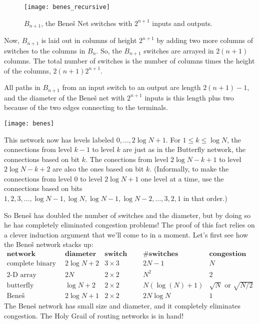 \begin{figure}
\texttt{[image: benes\_recursive]}
\caption{$B_{n+1}$, the Bene\v{s} Net switches with $2^{n+1}$ inputs
and outputs.}
\label{fig:benes-recursive}
\end{figure}

Now, $B_{n+1}$ is laid out in columns of height $2^{n+1}$ by adding two
more columns of switches to the columns in $B_n$.  So, the $B_{n+1}$
switches are arrayed in $2(n+1)$ columns.  The total number of
switches is the number of columns times the height of the columns, $2(n+1)2^{n+1}$.

All paths in $B_{n+1}$ from an input switch to an output are
length $2(n+1)-1$, and the diameter of the Bene\v{s} net with
$2^{n+1}$ inputs is this length plus two because of the two edges
connecting to the terminals.

\begin{editingnotes}

\texttt{[image: benes]}


This network now has levels labeled $0,\dots ,2 \log N + 1$. For $1 \leq k
\leq \log N$, the connections from level $k-1$ to level $k$ are just as in
the Butterfly network, the connections based on bit $k$. The conections
from level $2 \log N - k + 1$ to level $2 \log N - k + 2$ are also the
ones based on bit $k$.  (Informally, to make the connections from level
$0$ to level $2 \log N +1$ one level at a time, use the connections based
on bits $1,2,3,\dots, \log N - 1, \log N, \log N - 1, \log N - 2, \dots,
3,2,1$ in that order.)

\end{editingnotes}

So Bene\v{s} has doubled the number of switches and the diameter, but
by doing so he has completely eliminated congestion problems!  The proof
of this fact relies on a clever induction argument that we'll come to
in a moment.  Let's first see how the Bene\v{s} network stacks up:
%
\[
\begin{array}{r|c|c|c|c}
\textbf{network} &
\textbf{diameter} &
\textbf{switch size} &
\textbf{\# switches} &
\textbf{congestion} \\ \hline
\text{complete binary tree} & 2 \log N + 2 & 3 \times 3 & 2N - 1 & N \\
\text{2-D array} & 2 N & 2 \times 2 & N^2 & 2 \\
\text{butterfly} & \log N + 2 & 2 \times 2 & N (\log(N) + 1) & \sqrt{N} \text{ or } \sqrt{N/2} \\
\text{Bene\v{s}} & 2 \log N + 1 & 2 \times 2 &  2 N \log N & 1
\end{array}
\]
%
The Bene\v{s} network has small size and diameter, and it completely
eliminates congestion.  The Holy Grail of routing networks is in hand!

